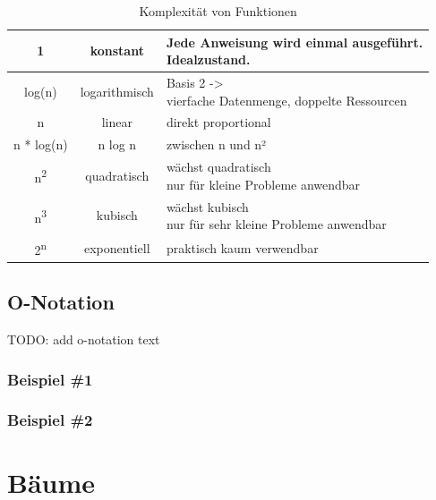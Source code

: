 \documentclass{article}
\begin{document}
\begin{table}[h!]
  \centering
  \begin{tabular}{ |c|c|l| }
    \hline
    1                    & konstant      & \makecell[l]{Jede Anweisung wird einmal ausgeführt. \\ Idealzustand.} \\
    \hline
    log(n)               & logarithmisch & \makecell[l]{Basis 2 ->                             \\ vierfache Datenmenge, doppelte Ressourcen} \\
    \hline
    n                    & linear        & direkt proportional                                 \\
    \hline
    n * log(n)           & n log n       & zwischen n und n²                                   \\
    \hline
    n\textsuperscript{2} & quadratisch   & \makecell[l]{wächst quadratisch                     \\ nur für kleine Probleme anwendbar} \\
    \hline
    n\textsuperscript{3} & kubisch       & \makecell[l]{wächst kubisch                         \\ nur für sehr kleine Probleme anwendbar} \\
    \hline
    2\textsuperscript{n} & exponentiell  & praktisch kaum verwendbar                           \\
    \hline
  \end{tabular}
  \caption{Komplexität von Funktionen}
  \label{tab:function_complexity}
\end{table}

\subsection{O-Notation}
TODO: add o-notation text

\subsubsection{Beispiel \#1}
\subsubsection{Beispiel \#2}

\newpage

\section{Bäume}
\end{document}

